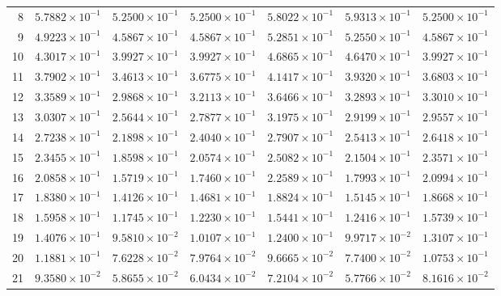 \begin{table}[H]
\begin{tabular}{@{}rrrrrrr@{}}
8 & $5.7882\times10^{-1}$ & $5.2500\times10^{-1}$ & $5.2500\times10^{-1}$ & $5.8022\times10^{-1}$ & $5.9313\times10^{-1}$ & $5.2500\times10^{-1}$\\
9 & $4.9223\times10^{-1}$ & $4.5867\times10^{-1}$ & $4.5867\times10^{-1}$ & $5.2851\times10^{-1}$ & $5.2550\times10^{-1}$ & $4.5867\times10^{-1}$\\
10 & $4.3017\times10^{-1}$ & $3.9927\times10^{-1}$ & $3.9927\times10^{-1}$ & $4.6865\times10^{-1}$ & $4.6470\times10^{-1}$ & $3.9927\times10^{-1}$\\
11 & $3.7902\times10^{-1}$ & $3.4613\times10^{-1}$ & $3.6775\times10^{-1}$ & $4.1417\times10^{-1}$ & $3.9320\times10^{-1}$ & $3.6803\times10^{-1}$\\
12 & $3.3589\times10^{-1}$ & $2.9868\times10^{-1}$ & $3.2113\times10^{-1}$ & $3.6466\times10^{-1}$ & $3.2893\times10^{-1}$ & $3.3010\times10^{-1}$\\
13 & $3.0307\times10^{-1}$ & $2.5644\times10^{-1}$ & $2.7877\times10^{-1}$ & $3.1975\times10^{-1}$ & $2.9199\times10^{-1}$ & $2.9557\times10^{-1}$\\
14 & $2.7238\times10^{-1}$ & $2.1898\times10^{-1}$ & $2.4040\times10^{-1}$ & $2.7907\times10^{-1}$ & $2.5413\times10^{-1}$ & $2.6418\times10^{-1}$\\
15 & $2.3455\times10^{-1}$ & $1.8598\times10^{-1}$ & $2.0574\times10^{-1}$ & $2.5082\times10^{-1}$ & $2.1504\times10^{-1}$ & $2.3571\times10^{-1}$\\
16 & $2.0858\times10^{-1}$ & $1.5719\times10^{-1}$ & $1.7460\times10^{-1}$ & $2.2589\times10^{-1}$ & $1.7993\times10^{-1}$ & $2.0994\times10^{-1}$\\
17 & $1.8380\times10^{-1}$ & $1.4126\times10^{-1}$ & $1.4681\times10^{-1}$ & $1.8824\times10^{-1}$ & $1.5145\times10^{-1}$ & $1.8668\times10^{-1}$\\
18 & $1.5958\times10^{-1}$ & $1.1745\times10^{-1}$ & $1.2230\times10^{-1}$ & $1.5441\times10^{-1}$ & $1.2416\times10^{-1}$ & $1.5739\times10^{-1}$\\
19 & $1.4076\times10^{-1}$ & $9.5810\times10^{-2}$ & $1.0107\times10^{-1}$ & $1.2400\times10^{-1}$ & $9.9717\times10^{-2}$ & $1.3107\times10^{-1}$\\
20 & $1.1881\times10^{-1}$ & $7.6228\times10^{-2}$ & $7.9764\times10^{-2}$ & $9.6665\times10^{-2}$ & $7.7400\times10^{-2}$ & $1.0753\times10^{-1}$\\
21 & $9.3580\times10^{-2}$ & $5.8655\times10^{-2}$ & $6.0434\times10^{-2}$ & $7.2104\times10^{-2}$ & $5.7766\times10^{-2}$ & $8.1616\times10^{-2}$\\

\end{tabular}
\end{table}
